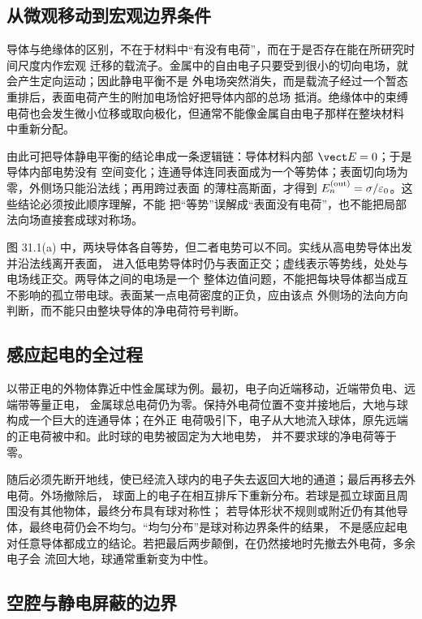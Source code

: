 \subsection*{从微观移动到宏观边界条件}

导体与绝缘体的区别，不在于材料中“有没有电荷”，而在于是否存在能在所研究时间尺度内作宏观
迁移的载流子。金属中的自由电子只要受到很小的切向电场，就会产生定向运动；因此静电平衡不是
外电场突然消失，而是载流子经过一个暂态重排后，表面电荷产生的附加电场恰好把导体内部的总场
抵消。绝缘体中的束缚电荷也会发生微小位移或取向极化，但通常不能像金属自由电子那样在整块材料
中重新分配。

由此可把导体静电平衡的结论串成一条逻辑链：导体材料内部 $\vect E=0$；于是导体内部电势没有
空间变化；连通导体连同表面成为一个等势体；表面切向场为零，外侧场只能沿法线；再用跨过表面
的薄柱高斯面，才得到 $E_n^{\rm(out)}=\sigma/\varepsilon_0$。这些结论必须按此顺序理解，不能
把“等势”误解成“表面没有电荷”，也不能把局部法向场直接套成球对称场。

图 31.1(a) 中，两块导体各自等势，但二者电势可以不同。实线从高电势导体出发并沿法线离开表面，
进入低电势导体时仍与表面正交；虚线表示等势线，处处与电场线正交。两导体之间的电场是一个
整体边值问题，不能把每块导体都当成互不影响的孤立带电球。表面某一点电荷密度的正负，应由该点
外侧场的法向方向判断，而不能只由整块导体的净电荷符号判断。

\subsection*{感应起电的全过程}

以带正电的外物体靠近中性金属球为例。最初，电子向近端移动，近端带负电、远端带等量正电，
金属球总电荷仍为零。保持外电荷位置不变并接地后，大地与球构成一个巨大的连通导体；在外正
电荷吸引下，电子从大地流入球体，原先远端的正电荷被中和。此时球的电势被固定为大地电势，
并不要求球的净电荷等于零。

随后必须先断开地线，使已经流入球内的电子失去返回大地的通道；最后再移去外电荷。外场撤除后，
球面上的电子在相互排斥下重新分布。若球是孤立球面且周围没有其他物体，最终分布具有球对称性；
若导体形状不规则或附近仍有其他导体，最终电荷仍会不均匀。“均匀分布”是球对称边界条件的结果，
不是感应起电对任意导体都成立的结论。若把最后两步颠倒，在仍然接地时先撤去外电荷，多余电子会
流回大地，球通常重新变为中性。

\subsection*{空腔与静电屏蔽的边界}

